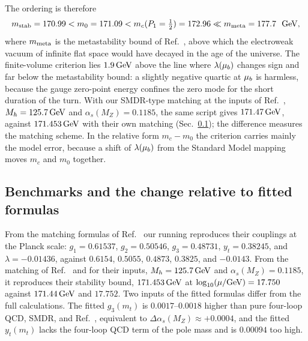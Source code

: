 The ordering is therefore
\begin{equation}
m_{\rm stab}=170.99<m_0=171.09<m_c(\Pone=\tfrac12)=172.96\ll m_{\rm meta}=177.7\ \ {\rm GeV}, %
\label{eq:rb-ordering}
\end{equation}
where $m_{\rm meta}$ is the metastability bound of Ref.~\cite{Andreassen:2017rzq}, above which the electroweak vacuum of infinite flat space would have decayed in the age of the universe.
The finite-volume criterion lies $1.9\,\mathrm{GeV}$ above the line where $\lambda(\mu_b)$ changes sign and far below the metastability bound: a slightly negative quartic at $\mu_b$ is harmless, because the gauge zero-point energy confines the zero mode for the short duration of the turn. %
With our SMDR-type matching at the inputs of Ref.~\cite{Bednyakov:2015sca}, $M_h=125.7\,\mathrm{GeV}$ and $\alpha_s(M_Z)=0.1185$, the same script gives $171.47\,\mathrm{GeV}$, against $171.453\,\mathrm{GeV}$ with their own matching (Sec.~\ref{sec:rb-sm-bench}); the difference measures the matching scheme. %
In the relative form $m_c-m_0$ the criterion carries mainly the model error, because a shift of $\lambda(\mu_b)$ from the Standard Model mapping moves $m_c$ and $m_0$ together.

\subsection{Benchmarks and the change relative to fitted formulas}
\label{sec:rb-sm-bench}

From the matching formulas of Ref.~\cite{Buttazzo:2013uya} our running reproduces their couplings at the Planck scale: $g_1=0.61537$, $g_2=0.50546$, $g_3=0.48731$, $y_t=0.38245$, and $\lambda=-0.01436$, against $0.6154$, $0.5055$, $0.4873$, $0.3825$, and $-0.0143$. %
From the matching of Ref.~\cite{Bednyakov:2015sca} and for their inputs, $M_h=125.7\,\mathrm{GeV}$ and $\alpha_s(M_Z)=0.1185$, it reproduces their stability bound, $171.453\,\mathrm{GeV}$ at $\log_{10}(\mu/{\rm GeV})=17.750$ against $171.44\,\mathrm{GeV}$ and $17.752$. %
Two inputs of the fitted formulas differ from the full calculations.
The fitted $g_3(m_t)$ is $0.0017$--$0.0018$ higher than pure four-loop QCD, SMDR, and Ref.~\cite{Bednyakov:2015sca}, equivalent to $\Delta\alpha_s(M_Z)\approx+0.0004$, and the fitted $y_t(m_t)$ lacks the four-loop QCD term of the pole mass and is $0.00094$ too high. %

